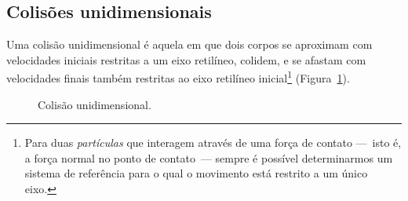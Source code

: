 
\subsection{Colisões unidimensionais}

Uma colisão unidimensional é aquela em que dois corpos se aproximam com velocidades iniciais restritas a um eixo retilíneo, colidem, e se afastam com velocidades finais também restritas ao eixo retilíneo inicial\footnote[][-2cm]{Para duas \emph{partículas} que interagem através de uma força de contato ---~isto é, a força normal no ponto de contato~--- sempre é possível determinarmos um sistema de referência para o qual o movimento está restrito a um único eixo.} (Figura~\ref{Fig:ColisaoUnidimensional}).

\begin{figure}[htb]\forcerectofloat
\centering
{}
\caption{Colisão unidimensional. \label{Fig:ColisaoUnidimensional}}
\end{figure}

